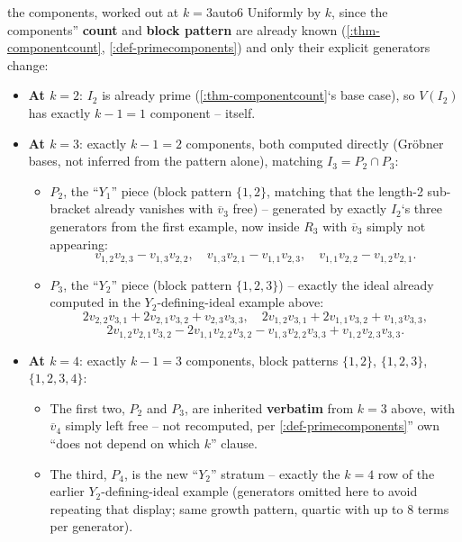 \documentclass[a4paper,11pt]{scrartcl}
\begin{document}
\begin{example}{the components, worked out at \(k = 3\)}{auto6} Uniformly by \(k\), since the components'' \textbf{count} and \textbf{block pattern} are already known (\cref{:thm-componentcount}, \cref{:def-primecomponents}) and only their explicit generators change:

\begin{itemize}
\item
  \textbf{At \(k = 2\)}: \(I_{2}\) is already prime (\cref{:thm-componentcount}`s base case), so \(V\left( I_{2} \right)\) has exactly \(k - 1 = 1\) component -- itself.
\item
  \textbf{At \(k = 3\)}: exactly \(k - 1 = 2\) components, both computed directly (Gröbner bases, not inferred from the pattern alone), matching \(I_{3} = P_{2} \cap P_{3}\):

  \begin{itemize}
  \item
    \(P_{2}\), the ``\(Y_{1}\)'' piece (block pattern \(\{ 1,2\}\), matching that the length-2 sub-bracket already vanishes with \({\overline{v}}_{3}\) free) -- generated by exactly \(I_{2}\)`s three generators from the first example, now inside \(R_{3}\) with \({\overline{v}}_{3}\) simply not appearing: \[v_{1,2}v_{2,3} - v_{1,3}v_{2,2},\quad v_{1,3}v_{2,1} - v_{1,1}v_{2,3},\quad v_{1,1}v_{2,2} - v_{1,2}v_{2,1}.\]
  \item
    \(P_{3}\), the ``\(Y_{2}\)'' piece (block pattern \(\{ 1,2,3\}\)) -- exactly the ideal already computed in the \(Y_{2}\)-defining-ideal example above: \[2v_{2,2}v_{3,1} + 2v_{2,1}v_{3,2} + v_{2,3}v_{3,3},\quad 2v_{1,2}v_{3,1} + 2v_{1,1}v_{3,2} + v_{1,3}v_{3,3},\] \[2v_{1,2}v_{2,1}v_{3,2} - 2v_{1,1}v_{2,2}v_{3,2} - v_{1,3}v_{2,2}v_{3,3} + v_{1,2}v_{2,3}v_{3,3}.\]
  \end{itemize}
\item
  \textbf{At \(k = 4\)}: exactly \(k - 1 = 3\) components, block patterns \(\{ 1,2\}\), \(\{ 1,2,3\}\), \(\{ 1,2,3,4\}\):

  \begin{itemize}
  \item
    The first two, \(P_{2}\) and \(P_{3}\), are inherited \textbf{verbatim} from \(k = 3\) above, with \({\overline{v}}_{4}\) simply left free -- not recomputed, per \cref{:def-primecomponents}'' own ``does not depend on which \(k\)'' clause.
  \item
    The third, \(P_{4}\), is the new ``\(Y_{2}\)'' stratum -- exactly the \(k = 4\) row of the earlier \(Y_{2}\)-defining-ideal example (generators omitted here to avoid repeating that display; same growth pattern, quartic with up to 8 terms per generator).
  \end{itemize}
\end{itemize}

\end{example}
\end{document}
